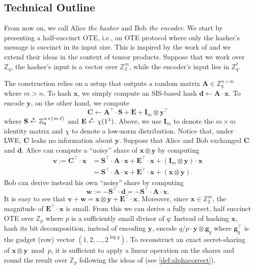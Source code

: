 \documentclass{theoretics}
\newcommand{\getsr}{\overset{\raisebox{-1pt}{$\scriptscriptstyle \$$}}{\gets}}
\newcommand{\sample}{\getsr}
\newcommand{\Z}{\mathbb{Z}}
\renewcommand{\sec}{\ensuremath{\lambda}}
\newcommand{\id}{\ensuremath{\mathbf{I}}}
\newcommand\bbbone{1}
\begin{document}
\subsection{Technical Outline}
From now on, we call Alice \emph{the hasher} and Bob \emph{the encoder}.
We start by presenting a half-succinct OTE, i.e., an OTE protocol where only the hasher's message is succinct in its input size. This is inspired by the work of \cite{EC:AbrRoySch24} 
and we extend their ideas in the context of tensor products. Suppose that we work over $\Z_q$, the hasher's input is a vector over $\Z_2^m$, while the encoder's input lies in $\Z_q^\ell$.

The construction relies on a setup that outputs a random matrix $\mathbf{A}\in\Z_q^{n\times m}$ where $m>n$. To hash $\mathbf{x}$, we simply compute an SIS-based hash $\mathbf{d}\gets \mathbf{A}\cdot \mathbf{x}$. To encode $\mathbf{y}$, on the other hand, we compute
\[\mathbf{C}\gets \mathbf{A}^\intercal \cdot \mathbf{S}+\mathbf{E}+\id_m\otimes \mathbf{y}^\intercal\]
where $\mathbf{S}\sample\Z_q^{n\times (m\cdot \ell)}$ and $\mathbf{E}\sample\chi(\bbbone^\sec)$. Above, we use $\id_m$ to denote the $m\times m$ identity matrix and $\chi$ to denote a low-norm distribution. Notice that, under LWE, $\mathbf{C}$ leaks no information about $\mathbf{y}$. Suppose that Alice and Bob exchanged $\mathbf{C}$ and $\mathbf{d}$. Alice can compute a ``noisy'' share of $\mathbf{x}\otimes \mathbf{y}$ by computing
\begin{align*}
\mathbf{v}:=\mathbf{C}^\intercal\cdot \mathbf{x}&=\mathbf{S}^\intercal\cdot \mathbf{A} \cdot \mathbf{x}+\mathbf{E}^\intercal\cdot\mathbf{x}+(\id_m\otimes \mathbf{y})\cdot\mathbf{x}\\
&=\mathbf{S}^\intercal\cdot\mathbf{A} \cdot \mathbf{x}+\mathbf{E}^\intercal\cdot\mathbf{x}+(\mathbf{x}\otimes \mathbf{y}).
\end{align*}
Bob can derive instead his own ``noisy'' share by computing
\[\mathbf{w}:=-\mathbf{S}^\intercal \cdot \mathbf{d}=-\mathbf{S}^\intercal\cdot\mathbf{A}\cdot \mathbf{x}.\]
It is easy to see that $\mathbf{v}+\mathbf{w}=\mathbf{x}\otimes \mathbf{y}+\mathbf{E}^\intercal\cdot\mathbf{x}$. Moreover, since $\mathbf{x}\in\Z_2^m$, the magnitude of $\mathbf{E}^\intercal\cdot\mathbf{x}$ is small. From this we can derive a fully correct, half succinct OTE over $\Z_p$ where $p$ is a sufficiently small divisor of $q$: Instead of hashing $\mathbf{x}$, hash its bit decomposition, instead of encoding $\mathbf{y}$, encode $q/p\cdot \mathbf{y}\otimes \mathbf{g}_q$ where $\mathbf{g}_q^\intercal$ is the gadget (row) vector $(1, 2, \dots, 2^{\log q})$. To reconstruct an exact secret-sharing of $\mathbf{x}\otimes \mathbf{y} \bmod p$, it is sufficient to apply a linear operation on the shares and round the result over $\Z_p$ following the ideas of \cite{C:DHRW16} (see \ref{def:alphacorrect}).
\end{document}
